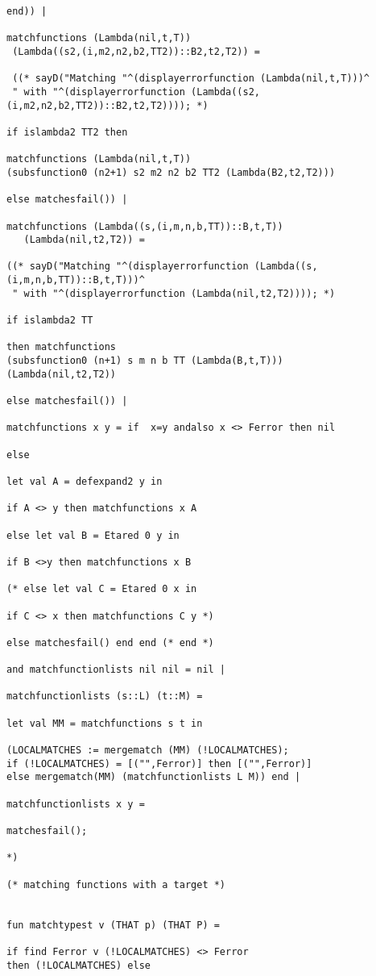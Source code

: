 \documentclass[12pt]{article}
\begin{document}
\begin{verbatim}
end)) |

matchfunctions (Lambda(nil,t,T)) 
 (Lambda((s2,(i,m2,n2,b2,TT2))::B2,t2,T2)) =
 
 ((* sayD("Matching "^(displayerrorfunction (Lambda(nil,t,T)))^
 " with "^(displayerrorfunction (Lambda((s2,(i,m2,n2,b2,TT2))::B2,t2,T2)))); *)

if islambda2 TT2 then

matchfunctions (Lambda(nil,t,T))
(subsfunction0 (n2+1) s2 m2 n2 b2 TT2 (Lambda(B2,t2,T2))) 

else matchesfail()) |

matchfunctions (Lambda((s,(i,m,n,b,TT))::B,t,T))
   (Lambda(nil,t2,T2)) = 
   
((* sayD("Matching "^(displayerrorfunction (Lambda((s,(i,m,n,b,TT))::B,t,T)))^
 " with "^(displayerrorfunction (Lambda(nil,t2,T2)))); *)

if islambda2 TT 

then matchfunctions
(subsfunction0 (n+1) s m n b TT (Lambda(B,t,T)))
(Lambda(nil,t2,T2))

else matchesfail()) |

matchfunctions x y = if  x=y andalso x <> Ferror then nil

else 

let val A = defexpand2 y in 

if A <> y then matchfunctions x A

else let val B = Etared 0 y in

if B <>y then matchfunctions x B

(* else let val C = Etared 0 x in

if C <> x then matchfunctions C y *)

else matchesfail() end end (* end *)

and matchfunctionlists nil nil = nil |

matchfunctionlists (s::L) (t::M) =

let val MM = matchfunctions s t in

(LOCALMATCHES := mergematch (MM) (!LOCALMATCHES);
if (!LOCALMATCHES) = [("",Ferror)] then [("",Ferror)]
else mergematch(MM) (matchfunctionlists L M)) end |

matchfunctionlists x y = 

matchesfail();

*)

(* matching functions with a target *)


fun matchtypest v (THAT p) (THAT P) = 

if find Ferror v (!LOCALMATCHES) <> Ferror 
then (!LOCALMATCHES) else


\end{verbatim}
\end{document}

